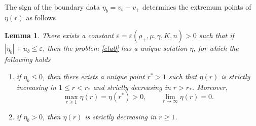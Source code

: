 \documentclass[a4paper,12pt,draft]{article}
\newtheorem{lemma}[theorem]{Lemma}
\theoremstyle{remark}
\def\ep{\varepsilon}
\begin{document}
The sign of the boundary data $\eta_b=v_b-v_+$ determines the extremum points of $\eta(r)$ as follows
\begin{lemma}
    There exists a constant $\ep=\ep(\rho_+,\mu,\gamma,K,n)>0$ such that if $|\eta_b|+ u_b \le \ep$, then the problem \eqref{eta0} has a unique solution $\eta$, for which the following holds
    \begin{enumerate}[label=\textnormal{(\Alph*)},ref=\textnormal{(\Alph*)}]
        \item\label{item:A} if $\eta_b\le 0$, then there exists a unique point $r^{\ast}>1$ such that $\eta(r)$ is strictly increasing in $1\le r<r_{\ast}$ and strictly decreasing in $r>r_{\ast}$. Moreover,
        \begin{equation}
            \max_{r\ge 1}\eta(r) = \eta(r^{\ast}) >0, \qquad \lim\limits_{r\to\infty} \eta(r) = 0. 
        \end{equation}
        \item\label{item:B} if $\eta_b>0$, then $\eta(r)$ is strictly decreasing in $r\ge 1$.
    \end{enumerate}
\end{lemma}
\end{document}
